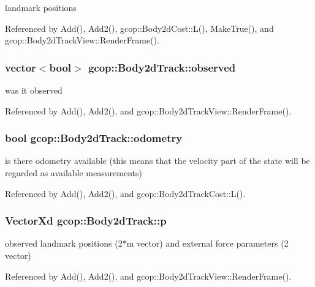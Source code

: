 landmark positions 



\-Referenced by \-Add(), \-Add2(), gcop\-::\-Body2d\-Cost\-::\-L(), \-Make\-True(), and gcop\-::\-Body2d\-Track\-View\-::\-Render\-Frame().

\subsubsection[{observed}]{\setlength{\rightskip}{0pt plus 5cm}vector$<$bool$>$ {\bf gcop\-::\-Body2d\-Track\-::observed}}\label{classgcop_1_1Body2dTrack_a3f4394572fe88fa8d87b02cd94b6c412}


was it observed 



\-Referenced by \-Add(), \-Add2(), and gcop\-::\-Body2d\-Track\-View\-::\-Render\-Frame().

\subsubsection[{odometry}]{\setlength{\rightskip}{0pt plus 5cm}bool {\bf gcop\-::\-Body2d\-Track\-::odometry}}\label{classgcop_1_1Body2dTrack_a0175c2fd9d3671cb9422ed04b977c238}


is there odometry available (this means that the velocity part of the state will be regarded as available measurements) 



\-Referenced by \-Add(), \-Add2(), and gcop\-::\-Body2d\-Track\-Cost\-::\-L().

\subsubsection[{p}]{\setlength{\rightskip}{0pt plus 5cm}\-Vector\-Xd {\bf gcop\-::\-Body2d\-Track\-::p}}\label{classgcop_1_1Body2dTrack_ae21aa03396bed0cecba10dfd9437c770}


observed landmark positions (2$\ast$m vector) and external force parameters (2 vector) 



\-Referenced by \-Add(), \-Add2(), and gcop\-::\-Body2d\-Track\-View\-::\-Render\-Frame().

